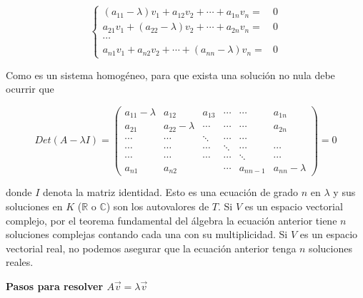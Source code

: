 \begin{equation} \label{matriz A}
\left\{ \begin{array} {ccl} 
                    (a_{11}-\lambda)v_1+a_{12}v_2+\cdots +a_{1n}v_n  =& 0  \\
                    a_{21}v_1+(a_{22}-\lambda)v_2+\cdots +a_{2n}v_n =& 0 \\
										\cdots  \\
                    a_{n1}v_1+a_{n2}v_2+\cdots +(a_{nn}-\lambda)v_n  =& 0
                   \end{array}
           \right.
\end{equation}

\bigskip


Como es un sistema homogéneo, para que exista una solución no nula debe ocurrir que 

\bigskip

\begin{equation} \label{polca}
Det(A-\lambda I)=\left(\begin{array}{cccccc}a_{11}-\lambda & a_{12} & a_{13} &\cdots  &\cdots & a_{1n}\\ a_{21} & a_{22}-\lambda    &\cdots  &\cdots  &\cdots &a_{2n}
\\\cdots & \cdots   &\ddots   &  \cdots  &   \cdots   \\ \cdots & \cdots  & \cdots  &  \ddots  &\cdots   & \cdots  
\\ \cdots & \cdots  & \cdots  &  \cdots  &\ddots   & \cdots 
\\ a_{n1} & a_{n2}  &  &\cdots  &  a_{nn-1} & a_{nn}-\lambda
\end{array}
 \right) =  0
\end{equation}

\bigskip

\noindent
donde $I$ denota la matriz identidad. Esto es una ecuación de grado $n$ en $\lambda$ y sus soluciones en $K$ ($\mathbb{R}$ o $\mathbb{C}$) son los autovalores de $T$. 
Si $V$ es un espacio vectorial complejo, por el teorema fundamental del álgebra la ecuación anterior tiene $n$ soluciones complejas contando cada una con su multiplicidad. Si $V$ es un espacio vectorial real, no podemos asegurar que la ecuación anterior tenga $n$ soluciones reales.


\bigskip
{\textbf{Pasos para resolver $A\vec{v}=\lambda \vec{v}$}}

\bigskip

